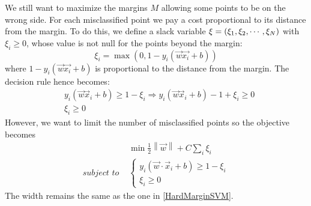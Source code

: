 \documentclass[12pt, letterpaper]{article}
\theoremstyle{definition}
\DeclarePairedDelimiter\autobracket{(}{)}
\newcommand{\br}[1]{\autobracket*{#1}}
\newcommand\norm[1]{\left\lVert#1\right\rVert}
\begin{document}
We still want to maximize the margins $M$ allowing some points to be on the wrong side. For each misclassified point we pay a cost proportional to its distance from the margin. To do this, we define a slack variable $\xi=\br{\xi_1, \xi_2, \cdots, \xi_N}$ with $\xi_i\ge 0$, whose value is not null for the points beyond the margin:
\begin{equation}
\xi_i = \max \left(0, 1-y_i(\vec{w}\vec{x_i}+b)\right)
\end{equation}
where $1-y_i(\vec{w}\vec{x_i}+b)$ is proportional to the distance from the margin.	
The decision rule hence becomes:
\begin{equation}
\begin{aligned}
& y_i \left( \vec{w} \vec{x}_i + b\right) \ge 1 - \xi_i \Rightarrow y_i \left( \vec{w} \vec{x}_i + b\right) - 1+ \xi_i  \ge 0 \\
& \xi_i \ge 0
\end{aligned}
\end{equation}
However, we want to limit the number of misclassified points so the objective becomes
\begin{equation}
\begin{aligned}
&\min \frac{1}{2} \norm{\vec{w}} + C \sum_i \xi_i\\
\textit{subject to }&\left\{
		\begin{array}{ll}
				y_i(\vec{w} \cdot \vec{x}_i+b) \ge 1-\xi_i\\ 
 				\xi_i \ge 0
		\end{array} 
\right.
\end{aligned}
\end{equation}
The width remains the same as the one in \ref{HardMarginSVM}. 

\iffalse
\end{document}
